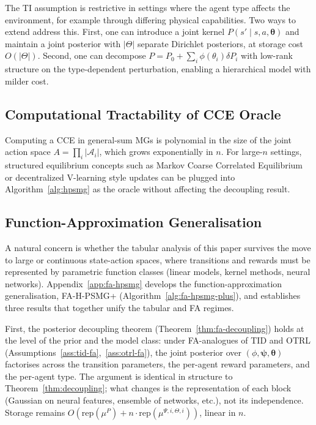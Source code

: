 \documentclass{article}
\def\textsuperscript#1{#1}%
\begin{document}
The TI assumption is restrictive in settings where the agent type affects the environment, for example through differing physical capabilities. Two ways to extend address this. First, one can introduce a joint kernel $P(s' \mid s, a, \boldsymbol{\theta})$ and maintain a joint posterior with $|\Theta|$ separate Dirichlet posteriors, at storage cost $O(|\Theta|)$. Second, one can decompose $P = P_0 + \sum_i \phi(\theta_i) \delta P_i$ with low-rank structure on the type-dependent perturbation, enabling a hierarchical model with milder cost.

\subsection{Computational Tractability of CCE Oracle}

Computing a CCE in general-sum MGs is polynomial in the size of the joint action space $A = \prod_i |\mathcal{A}_i|$, which grows exponentially in $n$. For large-$n$ settings, structured equilibrium concepts such as Markov Coarse Correlated Equilibrium \citep{daskalakis2023complexity} or decentralized V-learning style updates \citep{jin2021v} can be plugged into Algorithm~\ref{alg:hpsmg} as the oracle without affecting the decoupling result.

\subsection{Function-Approximation Generalisation}
\label{sec:fa-extension}

A natural concern is whether the tabular analysis of this paper survives the move to large or continuous state-action spaces, where transitions and rewards must be represented by parametric function classes (linear models, kernel methods, neural networks). Appendix~\ref{app:fa-hpsmg} develops the function-approximation generalisation, FA-H-PSMG\textsuperscript{+} (Algorithm~\ref{alg:fa-hpsmg-plus}), and establishes three results that together unify the tabular and FA regimes.

First, the posterior decoupling theorem (Theorem~\ref{thm:fa-decoupling}) holds at the level of the prior and the model class: under FA-analogues of TID and OTRL (Assumptions~\ref{ass:tid-fa},~\ref{ass:otrl-fa}), the joint posterior over $(\phi, \boldsymbol{\psi}, \boldsymbol{\theta})$ factorises across the transition parameters, the per-agent reward parameters, and the per-agent type. The argument is identical in structure to Theorem~\ref{thm:decoupling}; what changes is the representation of each block (Gaussian on neural features, ensemble of networks, etc.), not its independence. Storage remains $O(\mathrm{rep}(\mu^P) + n \cdot \mathrm{rep}(\mu^{\Psi, i, \Theta, i}))$, linear in $n$.
\end{document}
